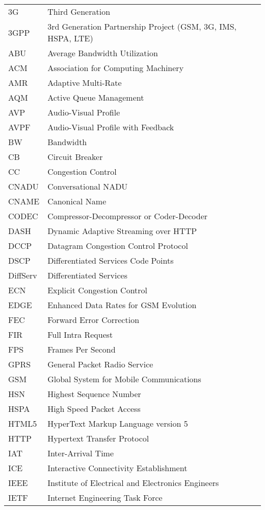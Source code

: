 \begin{longtable}{ll}
3G  	& Third Generation \\
3GPP 	& 3rd Generation Partnership Project (GSM, 3G, IMS, HSPA, LTE)\\
ABU 	& Average Bandwidth Utilization \\
ACM 	& Association for Computing Machinery \\
AMR 	& Adaptive Multi-Rate \\
AQM 	& Active Queue Management \\
AVP 	& Audio-Visual Profile \\
AVPF	& Audio-Visual Profile with Feedback \\
BW  	 & Bandwidth \\
CB  	& Circuit Breaker \\
CC  	& Congestion Control \\
CNADU	& Conversational NADU \\
CNAME	& Canonical Name \\
CODEC	& Compressor-Decompressor or Coder-Decoder \\
DASH 	& Dynamic Adaptive Streaming over HTTP \\
DCCP 	& Datagram Congestion Control Protocol \\
DSCP 	& Differentiated Services Code Points \\
DiffServ	& Differentiated Services \\
ECN  	& Explicit Congestion Control \\
EDGE 	& Enhanced Data Rates for GSM Evolution \\
FEC  	& Forward Error Correction \\
FIR 	& Full Intra Request \\
FPS 	& Frames Per Second \\
GPRS 	& General Packet Radio Service \\
GSM 	& Global System for Mobile Communications \\
HSN 	& Highest Sequence Number \\
HSPA 	& High Speed Packet Access \\
HTML5	& HyperText Markup Language version 5\\
HTTP 	& Hypertext Transfer Protocol \\
IAT  	& Inter-Arrival Time \\
ICE  	& Interactive Connectivity Establishment \\
IEEE 	& Institute of Electrical and Electronics Engineers \\
IETF	& Internet Engineering Task Force \\

\end{longtable}
